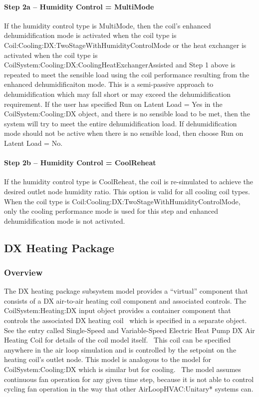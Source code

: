 \paragraph{Step 2a -- Humidity Control = MultiMode}\label{step-2a-humidity-control-multimode-1}

If the humidity control type is MultiMode, then the coil's enhanced dehumidification mode is activated when the coil type is Coil:Cooling:DX:TwoStageWithHumidityControlMode or the heat exchanger is activated when the coil type is \\
CoilSystem:Cooling:DX:CoolingHeatExchangerAssisted and Step 1 above is repeated to meet the sensible load using the coil performance resulting from the enhanced dehumidificaiton mode. This is a semi-passive approach to dehumidification which may fall short or may exceed the dehumidification requirement. If the user has specified Run on Latent Load = Yes in the CoilSystem:Cooling:DX object, and there is no sensible load to be met, then the system will try to meet the entire dehumidification load. If dehumidification mode should not be active when there is no sensible load, then choose Run on Latent Load = No.

\paragraph{Step 2b -- Humidity Control = CoolReheat}\label{step-2b-humidity-control-coolreheat-1}

If the humidity control type is CoolReheat, the coil is re-simulated to achieve the desired outlet node humidity ratio. This option is valid for all cooling coil types. When the coil type is Coil:Cooling:DX:TwoStageWithHumidityControlMode, only the cooling performance mode is used for this step and enhanced dehumidification mode is not activated.

\subsection{DX Heating Package}\label{dx-heating-package}

\subsubsection{Overview}\label{overview-6}

The DX heating package subsystem model provides a ``virtual'' component that consists of a DX air-to-air heating coil component and associated controls. The CoilSystem:Heating:DX input object provides a container component that controls the associated DX heating coil~ which is specified in a separate object. See the entry called Single-Speed and Variable-Speed Electric Heat Pump DX Air Heating Coil for details of the coil model itself.~ This coil can be specified anywhere in the air loop simulation and is controlled by the setpoint on the heating coil's outlet node. This model is analogous to the model for CoilSystem:Cooling:DX which is similar but for cooling.~ The model assumes continuous fan operation for any given time step, because it is not able to control cycling fan operation in the way that other AirLoopHVAC:Unitary* systems can.

